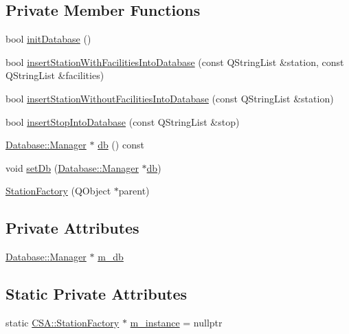 \subsection*{Private Member Functions}
\begin{DoxyCompactItemize}
\item 
bool \mbox{\hyperlink{classCSA_1_1StationFactory_a35a69c0ff6abaefbec286ddb775aa41f}{init\+Database}} ()
\item 
bool \mbox{\hyperlink{classCSA_1_1StationFactory_a955892172d726e701332bdd51b4d8c53}{insert\+Station\+With\+Facilities\+Into\+Database}} (const Q\+String\+List \&station, const Q\+String\+List \&facilities)
\item 
bool \mbox{\hyperlink{classCSA_1_1StationFactory_a3edfb2b4e1067ba6d85799784f3df68f}{insert\+Station\+Without\+Facilities\+Into\+Database}} (const Q\+String\+List \&station)
\item 
bool \mbox{\hyperlink{classCSA_1_1StationFactory_a0b7c8552c6e1f389b483daf7ee76d2b3}{insert\+Stop\+Into\+Database}} (const Q\+String\+List \&stop)
\item 
\mbox{\hyperlink{classDatabase_1_1Manager}{Database\+::\+Manager}} $\ast$ \mbox{\hyperlink{classCSA_1_1StationFactory_a402c022930515de30ed15233647b8b72}{db}} () const
\item 
void \mbox{\hyperlink{classCSA_1_1StationFactory_a9f55492093df763b743500a9243c242b}{set\+Db}} (\mbox{\hyperlink{classDatabase_1_1Manager}{Database\+::\+Manager}} $\ast$\mbox{\hyperlink{classCSA_1_1StationFactory_a402c022930515de30ed15233647b8b72}{db}})
\item 
\mbox{\hyperlink{classCSA_1_1StationFactory_ae24ebd450d0a02bc0d431c5fb91f0aa5}{Station\+Factory}} (Q\+Object $\ast$parent)
\end{DoxyCompactItemize}
\subsection*{Private Attributes}
\begin{DoxyCompactItemize}
\item 
\mbox{\hyperlink{classDatabase_1_1Manager}{Database\+::\+Manager}} $\ast$ \mbox{\hyperlink{classCSA_1_1StationFactory_a62dfd390a1c9430d131e0dc72106603c}{m\+\_\+db}}
\end{DoxyCompactItemize}
\subsection*{Static Private Attributes}
\begin{DoxyCompactItemize}
\item 
static \mbox{\hyperlink{classCSA_1_1StationFactory}{C\+S\+A\+::\+Station\+Factory}} $\ast$ \mbox{\hyperlink{classCSA_1_1StationFactory_a23e50080f272055c906807d809334b1b}{m\+\_\+instance}} = nullptr
\end{DoxyCompactItemize}


